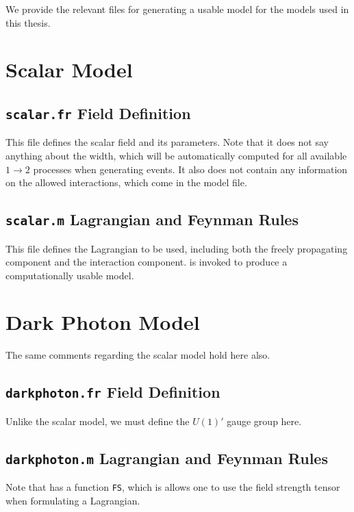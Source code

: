 \label{chapter:modelappendix}
We provide the relevant files for generating a usable \feynrules model for the models used in this thesis.

\section{Scalar Model}
\subsection{\texttt{scalar.fr} Field Definition}
This file defines the scalar field and its parameters.
Note that it does not say anything about the width, which will be automatically computed for all available $1 \rightarrow 2$ processes when generating events.
It also does not contain any information on the allowed interactions, which come in the model file.


\subsection{\texttt{scalar.m} Lagrangian and Feynman Rules}
This file defines the Lagrangian to be used, including both the freely propagating component and the interaction component.
\feynrules is invoked to produce a computationally usable model.



\section{Dark Photon Model}
The same comments regarding the scalar model hold here also.
\subsection{\texttt{darkphoton.fr} Field Definition}
Unlike the scalar model, we must define the $U(1)'$ gauge group here.

\subsection{\texttt{darkphoton.m} Lagrangian and Feynman Rules}
Note that \feynrules has a function \texttt{FS}, which is allows one to use the field strength tensor when formulating a Lagrangian.

